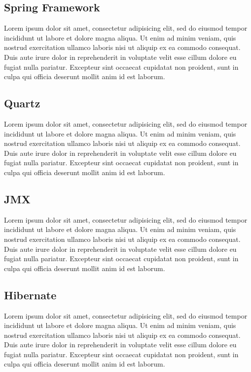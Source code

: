 \documentclass{article}
\begin{document}
\subsection{Spring Framework} %
\label{sub:spring_framework}
Lorem ipsum dolor sit amet, consectetur adipisicing elit, sed do eiusmod tempor incididunt ut labore et dolore magna aliqua. Ut enim ad minim veniam, quis nostrud exercitation ullamco laboris nisi ut aliquip ex ea commodo consequat. Duis aute irure dolor in reprehenderit in voluptate velit esse cillum dolore eu fugiat nulla pariatur. Excepteur sint occaecat cupidatat non proident, sunt in culpa qui officia deserunt mollit anim id est laborum.

\subsection{Quartz} %
\label{sub:quartz}
Lorem ipsum dolor sit amet, consectetur adipisicing elit, sed do eiusmod tempor incididunt ut labore et dolore magna aliqua. Ut enim ad minim veniam, quis nostrud exercitation ullamco laboris nisi ut aliquip ex ea commodo consequat. Duis aute irure dolor in reprehenderit in voluptate velit esse cillum dolore eu fugiat nulla pariatur. Excepteur sint occaecat cupidatat non proident, sunt in culpa qui officia deserunt mollit anim id est laborum.

\subsection{JMX} %
\label{sub:jmx}
Lorem ipsum dolor sit amet, consectetur adipisicing elit, sed do eiusmod tempor incididunt ut labore et dolore magna aliqua. Ut enim ad minim veniam, quis nostrud exercitation ullamco laboris nisi ut aliquip ex ea commodo consequat. Duis aute irure dolor in reprehenderit in voluptate velit esse cillum dolore eu fugiat nulla pariatur. Excepteur sint occaecat cupidatat non proident, sunt in culpa qui officia deserunt mollit anim id est laborum.

\subsection{Hibernate} %
\label{sub:hibernate}
Lorem ipsum dolor sit amet, consectetur adipisicing elit, sed do eiusmod tempor incididunt ut labore et dolore magna aliqua. Ut enim ad minim veniam, quis nostrud exercitation ullamco laboris nisi ut aliquip ex ea commodo consequat. Duis aute irure dolor in reprehenderit in voluptate velit esse cillum dolore eu fugiat nulla pariatur. Excepteur sint occaecat cupidatat non proident, sunt in culpa qui officia deserunt mollit anim id est laborum.
\end{document}
